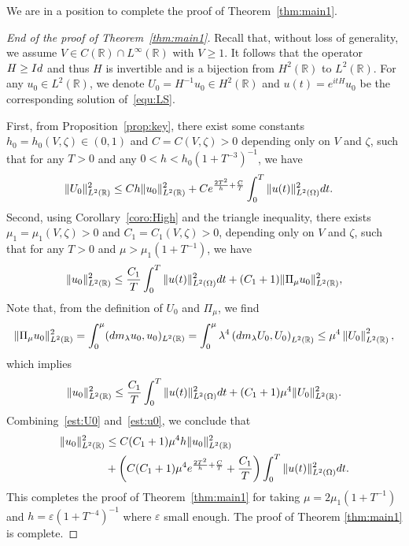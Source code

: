 \documentclass[a4paper,reqno]{amsart}
\theoremstyle{definition}
\numberwithin{equation}{section}
\newcommand{\R}{\mathbb{R}}
\def \R {{\mathbb{R} }}
\def \d {{\rm{d}}}
\begin{document}
We are in a position to complete the proof of Theorem~\ref{thm:main1}.

\begin{proof}[End of the proof of Theorem~\ref{thm:main1}]
Recall that, without loss of generality, we assume $V\in C(\R)\cap L^{\infty}(\R)$ with $V\ge 1$. It follows that the operator $H\ge {\rm{{Id}}}$ and thus $H$ is invertible and is a bijection from $H^{2}(\R)$ to $L^{2}(\R)$. For any $u_{0}\in L^{2}(\R)$, we denote $U_{0}=H^{-1}u_{0}\in H^{2}(\R)$ and $u(t)=e^{itH}u_{0}$ be the corresponding solution of~\eqref{equ:LS}. 

First, from Proposition~\ref{prop:key}, there exist some constants $h_{0}=h_{0}(V,\zeta)\in (0,1)$ and $C=C(V,\zeta)>0$ depending only on $V$ and $\zeta$, such that for any $T>0$ and any $0<h<h_{0}(1+T^{-3})^{-1}$, we have 
\begin{equation}\label{est:U0}
\begin{aligned}
    \|U_{0}\|_{L^{2}(\R)}^{2}
    &\le Ch\|u_{0}\|_{L^{2}(\R)}^{2}
    +Ce^{\frac{2T^{2}}{h}+\frac{C}{T}}\int_{0}^{T}\|u(t)\|_{L^{2}(\Omega)}^{2}\d t.
\end{aligned}
\end{equation}
Second, using Corollary~\ref{coro:High} and the triangle inequality, there exists $\mu_{1}=\mu_{1}(V,\zeta)>0$ and $C_{1}=C_{1}(V,\zeta)>0$, depending only on $V$ and $\zeta$, such that for any $T>0$ and $\mu>\mu_{1}(1+T^{-1}) $, we have 
\begin{equation*}
    \|u_{0}\|_{L^{2}(\R)}^{2}\le \frac{C_{1}}{T}\int_{0}^{T}\|u(t)\|_{L^{2}(\Omega)}^{2}\d t+(C_{1}+1)\|\Pi_{\mu} u_{0}\|_{L^{2}(\R)}^{2},
\end{equation*}
 Note that, from the definition of $U_{0}$ and $\Pi_{\mu}$, we find 
\begin{equation*}
    \|\Pi_{\mu} u_{0}\|_{L^{2}(\R)}^{2}=\int_{0}^{\mu}(\d m_{\lambda}u_{0},u_{0})_{L^{2}(\R)}=\int_{0}^{\mu}\lambda^{4}\left(\d m_{\lambda} U_{0},U_{0}\right)_{L^{2}(\R)}\le \mu^{4}\left\|U_{0}\right\|_{L^{2}(\R)}^{2},
    \end{equation*}
    which implies 
        \begin{equation}\label{est:u0}
    \|u_{0}\|_{L^{2}(\R)}^{2}\le \frac{C_{1}}{T}\int_{0}^{T}\|u(t)\|_{L^{2}(\Omega)}^{2}\d t+(C_{1}+1)\mu^{4}\|U_{0}\|_{L^{2}(\R)}^{2}.
   \end{equation}
   Combining~\eqref{est:U0} and~\eqref{est:u0}, we conclude that 
   \begin{equation*}
   \begin{aligned}
\|u_{0}\|_{L^{2}(\R)}^{2}
&\le C(C_{1}+1)\mu^{4}h\|u_{0}\|_{L^{2}(\R)}^{2}\\
&+\left(C(C_{1}+1)\mu^{4}e^{\frac{2T^{2}}{h}+\frac{C}{T}}+\frac{C_{1}}{T}\right)\int_{0}^{T}\|u(t)\|_{L^{2}(\Omega)}^{2}\d t.
\end{aligned}
\end{equation*}
This completes the proof of Theorem~\ref{thm:main1} for taking $\mu=2\mu_{1}(1+T^{-1}) $ and $h=\varepsilon(1+T^{-4})^{-1}$ where $\varepsilon$ small enough. The proof of Theorem \ref{thm:main1} is complete.
\end{proof}
\end{document}
